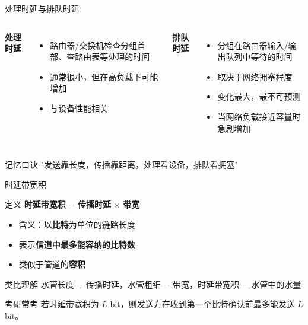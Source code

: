 \documentclass[10pt, aspectratio=169]{beamer}
\begin{document}
\begin{frame}{处理时延与排队时延}
    \begin{columns}[T]
        \textbf{处理时延}
        \begin{itemize}
            \item 路由器/交换机检查分组首部、查路由表等处理的时间
            \item 通常很小，但在高负载下可能增加
            \item 与设备性能相关
        \end{itemize}
        \textbf{排队时延}
        \begin{itemize}
            \item 分组在路由器输入/输出队列中等待的时间
            \item 取决于网络拥塞程度
            \item 变化最大，最不可预测
            \item 当网络负载接近容量时急剧增加
        \end{itemize}
    \end{columns}
    \vspace{0.5em}
    \begin{exampleblock}{记忆口诀}
        "发送靠长度，传播靠距离，处理看设备，排队看拥塞"
    \end{exampleblock}
\end{frame}

\begin{frame}{时延带宽积}
    \begin{block}{定义}
        \textbf{时延带宽积} = \textbf{传播时延} $\times$ \textbf{带宽}
    \end{block}
    \vspace{0.3em}
    \begin{itemize}
        \item 含义：以\textbf{比特}为单位的链路长度
        \item 表示\textbf{信道中最多能容纳的比特数}
        \item 类似于管道的\textbf{容积}
    \end{itemize}
    \vspace{0.5em}
    \begin{exampleblock}{类比理解}
        水管长度 = 传播时延，水管粗细 = 带宽，时延带宽积 = 水管中的水量
    \end{exampleblock}
    \vspace{0.3em}
    \begin{block}{考研常考}
        若时延带宽积为 $L$ bit，则发送方在收到第一个比特确认前最多能发送 $L$ bit。
    \end{block}
\end{frame}
\end{document}
